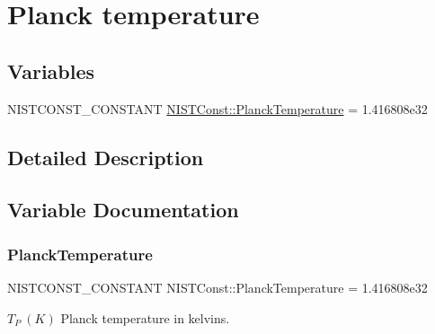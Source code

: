 \hypertarget{group___n_i_s_t_const-_planck_temperature}{}\section{Planck temperature}
\label{group___n_i_s_t_const-_planck_temperature}
\subsection*{Variables}
\begin{DoxyCompactItemize}
\item 
N\+I\+S\+T\+C\+O\+N\+S\+T\+\_\+\+C\+O\+N\+S\+T\+A\+NT \mbox{\hyperlink{group___n_i_s_t_const-_planck_temperature_ga3664ff00d4e3913e2be317c2579dac19}{N\+I\+S\+T\+Const\+::\+Planck\+Temperature}} = 1.\+416808e32
\end{DoxyCompactItemize}


\subsection{Detailed Description}


\subsection{Variable Documentation}
\mbox{\label{group___n_i_s_t_const-_planck_temperature_ga3664ff00d4e3913e2be317c2579dac19}} 
\subsubsection{\texorpdfstring{Planck\+Temperature}{PlanckTemperature}}
{\footnotesize\ttfamily N\+I\+S\+T\+C\+O\+N\+S\+T\+\_\+\+C\+O\+N\+S\+T\+A\+NT N\+I\+S\+T\+Const\+::\+Planck\+Temperature = 1.\+416808e32}

$T_P \ (K)$ Planck temperature in kelvins. 